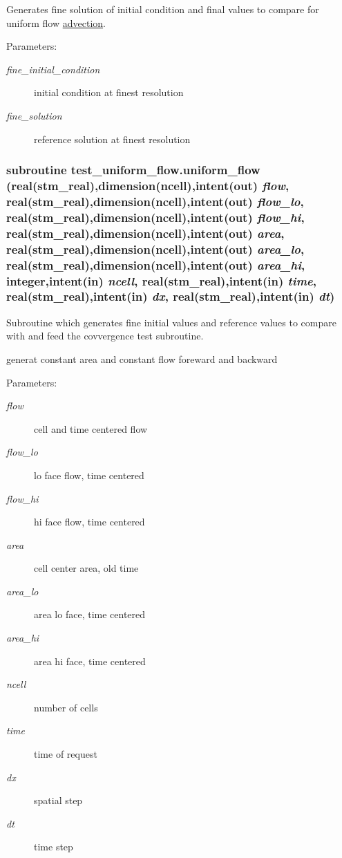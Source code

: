 Generates fine solution of initial condition and final values to compare for uniform flow \hyperlink{a00052}{advection}. 

\begin{Desc}
\item[Parameters:]
\begin{description}
\item[{\em fine\_\-initial\_\-condition}]initial condition at finest resolution\item[{\em fine\_\-solution}]reference solution at finest resolution \end{description}
\end{Desc}
\hypertarget{a00096_1f5028494dfe5bf537459dff8fe74d30}{
\subsubsection[{uniform\_\-flow}]{\setlength{\rightskip}{0pt plus 5cm}subroutine test\_\-uniform\_\-flow.uniform\_\-flow (real(stm\_\-real),dimension(ncell),intent(out) {\em flow}, \/  real(stm\_\-real),dimension(ncell),intent(out) {\em flow\_\-lo}, \/  real(stm\_\-real),dimension(ncell),intent(out) {\em flow\_\-hi}, \/  real(stm\_\-real),dimension(ncell),intent(out) {\em area}, \/  real(stm\_\-real),dimension(ncell),intent(out) {\em area\_\-lo}, \/  real(stm\_\-real),dimension(ncell),intent(out) {\em area\_\-hi}, \/  integer,intent(in) {\em ncell}, \/  real(stm\_\-real),intent(in) {\em time}, \/  real(stm\_\-real),intent(in) {\em dx}, \/  real(stm\_\-real),intent(in) {\em dt})}}
\label{a00096_1f5028494dfe5bf537459dff8fe74d30}


Subroutine which generates fine initial values and reference values to compare with and feed the covvergence test subroutine. 

generat constant area and constant flow foreward and backward \begin{Desc}
\item[Parameters:]
\begin{description}
\item[{\em flow}]cell and time centered flow\item[{\em flow\_\-lo}]lo face flow, time centered\item[{\em flow\_\-hi}]hi face flow, time centered\item[{\em area}]cell center area, old time\item[{\em area\_\-lo}]area lo face, time centered\item[{\em area\_\-hi}]area hi face, time centered\item[{\em ncell}]number of cells\item[{\em time}]time of request\item[{\em dx}]spatial step\item[{\em dt}]time step \end{description}
\end{Desc}

